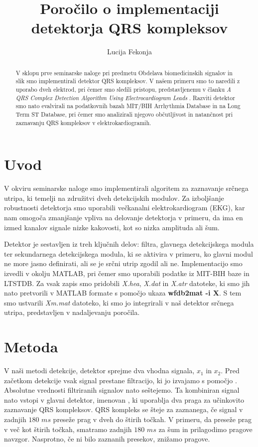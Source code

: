 \documentclass{article}
\author{Lucija Fekonja}
\title{Poročilo o implementaciji detektorja QRS kompleksov}
\begin{document}

    \maketitle

    \begin{abstract}
        V sklopu prve seminarske naloge pri predmetu Obdelava biomedicinskih signalov in slik smo
        implementirali detektor QRS kompleksov. V našem primeru smo to naredili z uporabo dveh elektrod, 
        pri čemer smo sledili pristopu, predstavljenemu v članku \emph{A QRS Complex Detection Algorithm Using 
        Electrocardiogram Leads} \cite{article}. Razviti detektor smo nato evalvirali na podatkovnih bazah MIT/BIH Arrhythmia Database
        in na Long Term ST Database, pri čemer smo analizirali 
        njegovo občutljivost in natančnost pri zaznavanju QRS kompleksov v elektrokardiogramih.
    \end{abstract}

    \section{Uvod}
    V okviru seminarske naloge smo implementirali algoritem za zaznavanje srčnega utripa, 
    ki temelji na združitvi dveh detekcijskih modulov. Za izboljšanje robustnosti detektorja smo 
    uporabili večkanalni elektrokardiogram (EKG), kar nam omogoča zmanjšanje vpliva na delovanje 
    detektorja v primeru, da ima en izmed kanalov signale nizke kakovosti, kot so nizka amplituda 
    ali šum. 

    Detektor je sestavljen iz treh ključnih delov: filtra, glavnega detekcijskega modula ter 
    sekundarnega detekcijskega modula, ki se aktivira v primeru, ko glavni modul ne more jasno definirati, 
    ali se je srčni utrip zgodil ali ne. Implementacijo smo izvedli v okolju MATLAB, pri čemer smo uporabili 
    podatke iz MIT-BIH baze in LTSTDB. Za vsak zapis smo pridobili \emph{X.hea}, \emph{X.dat} in \emph{X.atr} datoteke, ki smo jih nato 
    pretvorili v MATLAB formate s pomočjo ukaza \textbf{wfdb2mat -i X}. S tem smo ustvarili \emph{Xm.mat} datoteko, ki smo 
    jo integrirali v naš detektor srčnega utripa, predstavljen v nadaljevanju poročila.
    
    \section{Metoda}
    V naši metodi detekcije, detektor sprejme dva vhodna signala, $x_1$ in $x_2$. 
    Pred začetkom detekcije vsak signal prestane filtracijo, ki jo izvajamo s pomočjo . Absolutne vrednosti 
    filtriranih signalov nato seštejemo. Ta kombiniran signal nato vstopi v glavni detektor, imenovan , 
    ki uporablja dva praga za učinkovito zaznavanje QRS kompleksov. QRS kompleks se šteje za zaznanega, če signal 
    v zadnjih $180$ $ms$ preseže prag v dveh do štirih točkah. V primeru, da preseže prag v več kot štirih točkah, 
    smatramo zadnjih $180$ $ms$ za šum in prilagodimo pragove navzgor. Nasprotno, če ni bilo zaznanih presekov, znižamo pragove.
\end{document}
